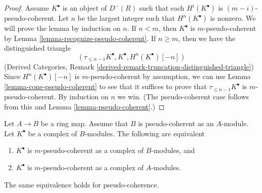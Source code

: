 \begin{proof}
Assume $K^\bullet$ is an object of $D^{-}(R)$ such that
each $H^i(K^\bullet)$ is $(m - i)$-pseudo-coherent.
Let $n$ be the largest integer such that $H^n(K^\bullet)$ is nonzero.
We will prove the lemma by induction on $n$.
If $n < m$, then $K^\bullet$ is $m$-pseudo-coherent by
Lemma \ref{lemma-recognize-pseudo-coherent}.
If $n \geq m$, then we have the distinguished triangle
$$
(\tau_{\leq n - 1}K^\bullet, K^\bullet, H^n(K^\bullet)[-n])
$$
(Derived Categories, Remark
\ref{derived-remark-truncation-distinguished-triangle})
Since $H^n(K^\bullet)[-n]$ is $m$-pseudo-coherent by assumption, we
can use
Lemma \ref{lemma-cone-pseudo-coherent}
to see that it suffices to prove that $\tau_{\leq n - 1}K^\bullet$
is $m$-pseudo-coherent. By induction on $n$ we win. (The pseudo-coherent
case follows from this and
Lemma \ref{lemma-pseudo-coherent}.)
\end{proof}

\begin{lemma}
\label{lemma-finite-push-pseudo-coherent}
Let $A \to B$ be a ring map. Assume that $B$ is pseudo-coherent as an
$A$-module. Let $K^\bullet$ be a complex of $B$-modules.
The following are equivalent
\begin{enumerate}
\item $K^\bullet$ is $m$-pseudo-coherent
as a complex of $B$-modules, and
\item $K^\bullet$ is $m$-pseudo-coherent
as a complex of $A$-modules.
\end{enumerate}
The same equivalence holds for pseudo-coherence.
\end{lemma}

